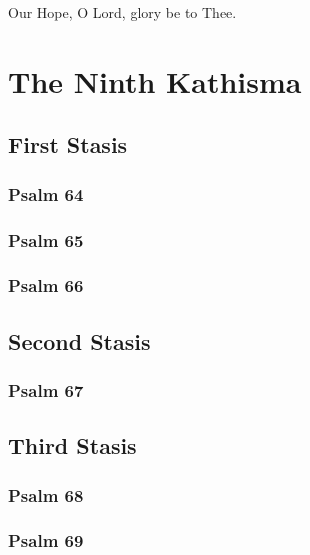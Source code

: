\documentclass[12pt]{book}
\newcommand{\kathismabreak}{
  \medskip
  \begin{center}
  \begin{footnotesize}
  

  

  

  
  \end{footnotesize}
  \end{center}
  \smallbreak
}
\newcommand{\kathismaend}{
  \medskip
  \begin{center}
  \begin{footnotesize}
  

  

  Our Hope, O Lord, glory be to Thee.
  \end{footnotesize}
  \end{center}
  \smallbreak
}
\begin{document}
\pagebreak %
\kathismaend

\section{The Ninth Kathisma}

\subsection{First Stasis}

\subsubsection{Psalm 64}


\subsubsection{Psalm 65}


\subsubsection{Psalm 66}


\kathismabreak

\subsection{Second Stasis}

\subsubsection{Psalm 67}


\pagebreak %
\kathismabreak

\subsection{Third Stasis}

\subsubsection{Psalm 68}


\subsubsection{Psalm 69}

\end{document}
